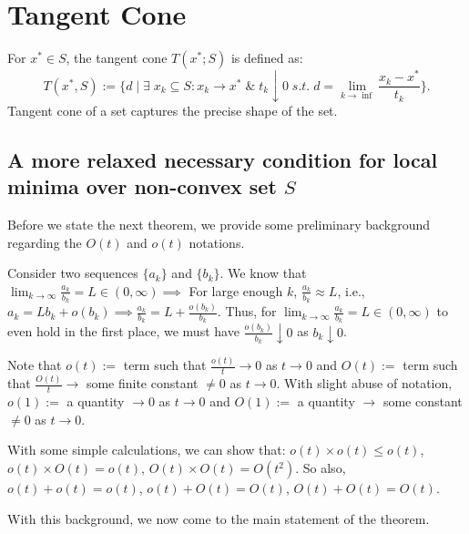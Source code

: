 \documentclass[twoside]{article}
\begin{document}
\section{Tangent Cone}
For $x^{*} \in S$, the tangent cone $T(x^{*};S)$ is defined as:
\begin{equation}\label{eq6}
T(x^{*},S) := \bigg\{d\;\bigg|\; \exists\;{x_{k}}\subseteq S: {x_{k}}\rightarrow x^{*} \; \& \; t_k\downarrow 0\;s.t.\;d=\lim_{k \to \inf} \frac{x_k-x^{*}}{t_k}\bigg\}.
\end{equation}
Tangent cone of a set captures the precise shape of the set.

\subsection{A more relaxed necessary condition for local minima over non-convex set $S$}
Before we state the next theorem, we provide some preliminary background regarding the $O(t)$ and $o(t)$ notations.\par
Consider two sequences $\{a_{k}\}$ and $\{b_{k}\}$. We know that  $\lim_{k\to\infty} \frac{a_{k}}{b_{k}} = L \in (0,\infty) \implies$ For large enough $k$, $\frac{a_{k}}{b_{k}} \approx L $, i.e., $a_{k} = Lb_{k} + o(b_{k}) \implies \frac{a_{k}}{b_{k}} = L + \frac{o(b_{k})}{b_{k}} $. Thus, for $\lim_{k\to\infty} \frac{a_{k}}{b_{k}} = L \in (0,\infty)$ to even hold in the first place, we must have $\frac{o(b_{k})}{b_{k}} \downarrow 0$ as $b_{k} \downarrow 0 $.\par
Note that $o(t) := $ term such that $\frac{o(t)}{t} \rightarrow 0$ as $t \rightarrow 0$ and $O(t) := $ term such that $\frac{O(t)}{t} \rightarrow$ some finite constant $\neq 0$ as $t \rightarrow 0$. With slight abuse of notation, $o(1):=$ a quantity $\rightarrow 0$ as $t \rightarrow 0$ and $O(1):=$ a quantity $\rightarrow$ some constant $\neq 0$ as $t \rightarrow 0$.\par
With some simple calculations, we can show that: $o(t) \times o(t) \leqslant o(t)$, $o(t) \times O(t) = o(t)$, $O(t) \times O(t) = O(t^2)$. So also, $o(t) + o(t) = o(t)$, $o(t) + O(t) = O(t)$, $O(t) + O(t) = O(t)$.\par
With this background, we now come to the main statement of the theorem.
\end{document}
